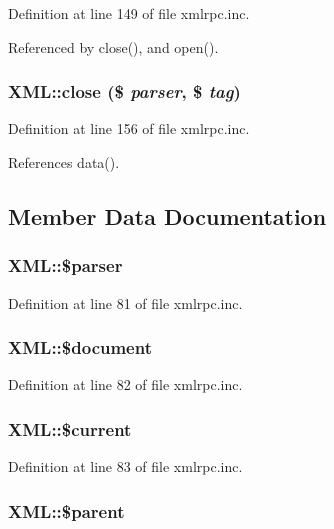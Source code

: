 Definition at line 149 of file xmlrpc.inc.

Referenced by close(), and open().\hypertarget{classXML_60144a2134fc1b7f5b4b1b6a7c56bf04}{
\subsubsection{\setlength{\rightskip}{0pt plus 5cm}XML::close (\$ {\em parser}, \$ {\em tag})}}
\label{classXML_60144a2134fc1b7f5b4b1b6a7c56bf04}




Definition at line 156 of file xmlrpc.inc.

References data().

\subsection{Member Data Documentation}
\hypertarget{classXML_fa14fbca44236b30ab5f3dcfc4b02890}{
\subsubsection{\setlength{\rightskip}{0pt plus 5cm}XML::\$parser}}
\label{classXML_fa14fbca44236b30ab5f3dcfc4b02890}




Definition at line 81 of file xmlrpc.inc.\hypertarget{classXML_01d565098eeda8bf09e4242a2748d570}{
\subsubsection{\setlength{\rightskip}{0pt plus 5cm}XML::\$document}}
\label{classXML_01d565098eeda8bf09e4242a2748d570}




Definition at line 82 of file xmlrpc.inc.\hypertarget{classXML_7c20d75c1719294f3320a537a32753ca}{
\subsubsection{\setlength{\rightskip}{0pt plus 5cm}XML::\$current}}
\label{classXML_7c20d75c1719294f3320a537a32753ca}




Definition at line 83 of file xmlrpc.inc.\hypertarget{classXML_fa51193c2f0b317f817fa3efa8722227}{
\subsubsection{\setlength{\rightskip}{0pt plus 5cm}XML::\$parent}}
\label{classXML_fa51193c2f0b317f817fa3efa8722227}




